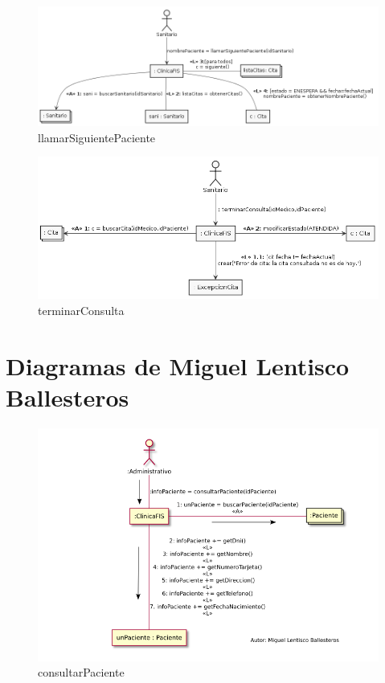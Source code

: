 \documentclass[11pt,a4paper]{article}
\begin{document}
\begin{figure}[H]
	\caption{llamarSiguientePaciente}
	\centering
	\includegraphics[width=\textwidth,height=\textheight,keepaspectratio]{Diagramas/llamarsiguientepaciente}
\end{figure}

\begin{figure}[H]
	\caption{terminarConsulta}
	\centering
	\includegraphics[width=\textwidth,height=\textheight,keepaspectratio]{Diagramas/terminarconsulta}
\end{figure}

\section{Diagramas de Miguel Lentisco Ballesteros}

\begin{figure}[H]
	\caption{consultarPaciente}
	\centering
	\includegraphics[width=\textwidth,height=\textheight,keepaspectratio]{Diagramas/consultarPaciente}
\end{figure}
\end{document}
